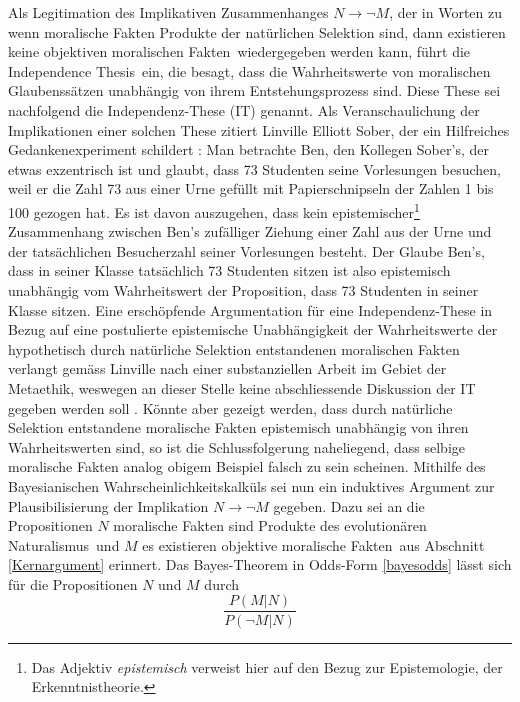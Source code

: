 \documentclass[a4paper,11pt]{article}
\numberwithin{equation}{section}
\begin{document}
Als Legitimation des Implikativen Zusammenhanges $N \rightarrow \neg M$, der in Worten zu \flqq wenn moralische Fakten Produkte der natürlichen Selektion sind, dann existieren keine objektiven moralischen Fakten\frqq\ wiedergegeben werden kann, führt \cite[S. 395]{Linville2009-LINTMA-2} die \flqq Independence Thesis\frqq\ ein, die besagt, dass die Wahrheitswerte von moralischen Glaubenssätzen unabhängig von ihrem Entstehungsprozess sind. Diese These sei nachfolgend die Independenz-These (IT) genannt. Als Veranschaulichung der Implikationen einer solchen These zitiert Linville Elliott Sober, der ein Hilfreiches Gedankenexperiment schildert \cite[S. 93-113]{Sober.1994}: Man betrachte Ben, den Kollegen Sober's, der etwas exzentrisch ist und glaubt, dass 73 Studenten seine Vorlesungen besuchen, weil er die Zahl 73 aus einer Urne gefüllt mit Papierschnipseln der Zahlen 1 bis 100 gezogen hat. Es ist davon auszugehen, dass kein epistemischer\footnote{Das Adjektiv \textit{epistemisch} verweist hier auf den Bezug zur Epistemologie, der Erkenntnistheorie.} Zusammenhang zwischen Ben's zufälliger Ziehung einer Zahl aus der Urne und der tatsächlichen Besucherzahl seiner Vorlesungen besteht. Der Glaube Ben's, dass in seiner Klasse tatsächlich 73 Studenten sitzen ist also epistemisch unabhängig vom Wahrheitswert der Proposition, dass 73 Studenten in seiner Klasse sitzen. Eine erschöpfende Argumentation für eine Independenz-These in Bezug auf eine postulierte epistemische Unabhängigkeit der Wahrheitswerte der hypothetisch durch natürliche Selektion entstandenen moralischen Fakten verlangt gemäss Linville nach einer substanziellen Arbeit im Gebiet der Metaethik, weswegen an dieser Stelle keine abschliessende Diskussion der IT gegeben werden soll \cite[S. 396]{Linville2009-LINTMA-2}. Könnte aber gezeigt werden, dass durch natürliche Selektion entstandene moralische Fakten epistemisch unabhängig von ihren Wahrheitswerten sind, so ist die Schlussfolgerung naheliegend, dass selbige moralische Fakten analog obigem Beispiel falsch zu sein scheinen. Mithilfe des Bayesianischen Wahrscheinlichkeitskalküls sei nun ein induktives Argument zur Plausibilisierung der Implikation $N \rightarrow \neg M$ gegeben. Dazu sei an die Propositionen $N$ \flqq moralische Fakten sind Produkte des evolutionären Naturalismus\frqq\ und $M$ \flqq es existieren objektive moralische Fakten\frqq\ aus Abschnitt \ref{Kernargument} erinnert. Das Bayes-Theorem in Odds-Form \eqref{bayesodds} lässt sich für die Propositionen $N$ und $M$ durch \begin{equation}
\frac{P(M|N)}{P(\neg M|N)}

\end{equation}
\end{document}
